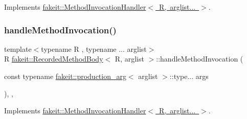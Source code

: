 Implements \mbox{\hyperlink{structfakeit_1_1MethodInvocationHandler_a6ef3fe1e948c1886a085bd948d61f730}{fakeit\+::\+Method\+Invocation\+Handler$<$ R, arglist... $>$}}.

\mbox{\label{classfakeit_1_1RecordedMethodBody_a7ba17fdfe96f573c1d3992433a50d170}} 
\subsubsection{\texorpdfstring{handleMethodInvocation()}{handleMethodInvocation()}\hspace{0.1cm}{\footnotesize\ttfamily [6/9]}}
{\footnotesize\ttfamily template$<$typename R , typename ... arglist$>$ \\
R \mbox{\hyperlink{classfakeit_1_1RecordedMethodBody}{fakeit\+::\+Recorded\+Method\+Body}}$<$ R, arglist $>$\+::handle\+Method\+Invocation (\begin{DoxyParamCaption}\item[{const typename \mbox{\hyperlink{structfakeit_1_1production__arg}{fakeit\+::production\+\_\+arg}}$<$ arglist $>$\+::type...}]{args }\end{DoxyParamCaption})\hspace{0.3cm}{\ttfamily [inline]}, {\ttfamily [override]}, {\ttfamily [virtual]}}



Implements \mbox{\hyperlink{structfakeit_1_1MethodInvocationHandler_a6ef3fe1e948c1886a085bd948d61f730}{fakeit\+::\+Method\+Invocation\+Handler$<$ R, arglist... $>$}}.

\mbox{\label{classfakeit_1_1RecordedMethodBody_a7ba17fdfe96f573c1d3992433a50d170}} 
